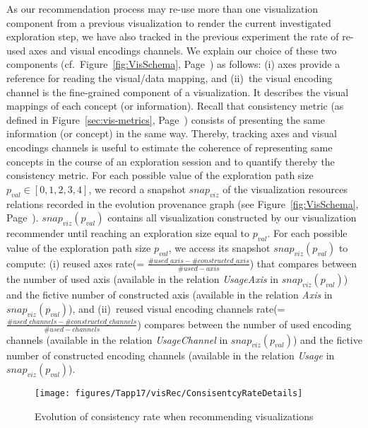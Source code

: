 As our recommendation process may re-use more than one visualization component from a previous visualization to render the current investigated exploration step, we have also tracked in the previous experiment the rate of re-used axes and visual encodings channels.
We explain our choice of these two components (cf.~Figure~\ref{fig:VisSchema}, Page~\pageref{fig:VisSchema}) as follows: (i) axes provide a reference for reading the visual/data mapping, and (ii)~the visual encoding channel  is the fine-grained component of a visualization. It describes the visual mappings of each concept (or information).
Recall that consistency metric (as defined in Figure~\ref{sec:vis-metrics}, Page~\pageref{sec:vis-metrics}) consists of presenting the same information (or concept) in the same way.
Thereby, tracking axes and visual encodings channels is useful to estimate the coherence of representing same concepts in the course of an exploration session and to quantify thereby the consistency metric.
For each possible value of the exploration path size $p_{val} \in [0,1,2,3,4]$, we record a snapshot $snap_{viz}$ of the visualization resources relations recorded in the evolution provenance graph (see Figure~\ref{fig:VisSchema}, Page~\pageref{fig:VisSchema}).
$snap_{viz}(p_{val})$ contains all visualization constructed by our visualization recommender until reaching an exploration size equal to $p_{val}$.
For each possible value of the exploration path size $p_{val}$, we access its snapshot $snap_{viz}(p_{val})$ to compute: 
 (i) reused axes rate(= $\frac{\#used\_axis - \#constructed\_axis}{\#used-axis}$) that compares between the number of used axis (available in the relation \emph{UsageAxis} in $snap_{viz}(p_{val})$) and the fictive number of constructed axis (available in the relation \emph{Axis} in $snap_{viz}(p_{val})$), and (ii)~reused visual encoding channels rate(= $\frac{\#used\_channels-\#constructed\_channels}{\#used-channels}$) compares between the number of used encoding channels (available in the relation \emph{UsageChannel} in $snap_{viz}(p_{val})$) and the fictive number of constructed encoding channels (available in the relation \emph{Usage} in $snap_{viz}(p_{val})$).



\begin{figure}[t]
\centering
\texttt{[image: figures/Tapp17/visRec/ConsisentcyRateDetails]}
\caption{Evolution of consistency rate when recommending visualizations}
\label{fig:vis-consistency-details}
\end{figure}



